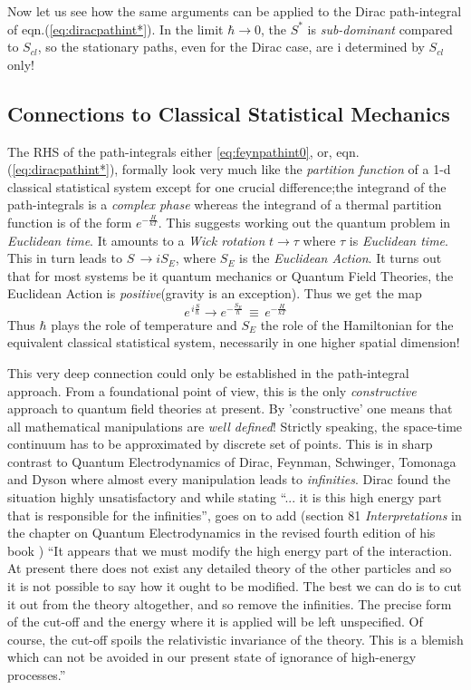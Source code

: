 \documentclass[12pt]{article}
\newcommand{\be}{\begin{equation}}
\newcommand{\ee}{\end{equation}}
\begin{document}
Now let us see how the same arguments can be applied to the Dirac path-integral of eqn.(\ref{eq:diracpathint*}). In the limit 
$\hbar \rightarrow  0$, the $S^*$ is \emph{sub-dominant} compared to $S_{cl}$, so the stationary paths, even for the Dirac case, are i
determined by $S_{cl}$ only!
\subsection{Connections to Classical Statistical Mechanics}
The RHS of the path-integrals either \ref{eq:feynpathint0}, or, eqn.(\ref{eq:diracpathint*}), formally look very much like 
the {\it partition function} of a 1-d classical
statistical system except for one crucial difference;the integrand of the path-integrals is a {\it complex phase} whereas the integrand of
a thermal partition function is of the form $e^{- \frac{H}{kT}}$. This suggests working out the quantum problem in {\it Euclidean time}. It
amounts to a {\it Wick rotation} $t \rightarrow  \tau$ where $\tau$ is {\it Euclidean time}. This in turn leads to $S\,\rightarrow i S_E$,
where $S_E$ is the {\it Euclidean Action}.
It turns out that for most systems be it 
quantum mechanics or Quantum Field Theories, the  Euclidean Action is {\it positive}(gravity is an exception). Thus we get the map
\be
\label{eq:euclidean}
e^{\,i \frac{S}{\hbar}} \rightarrow e^{- \frac{S_E}{\hbar}}\,\equiv\,e^{- \frac{H}{kT}}
\ee
Thus $\hbar$ plays the role of temperature and $S_E$ the role of the Hamiltonian for the equivalent classical statistical system, necessarily
in one higher spatial dimension!

This very deep connection could only be established in the path-integral approach. From a foundational point of view, this is the only
{\it constructive} approach to quantum field theories at present. By 'constructive' one means that all mathematical manipulations are
{\it well defined}! Strictly speaking, the space-time continuum has to be approximated by discrete set of points. This is in sharp contrast 
to Quantum Electrodynamics of Dirac, Feynman, Schwinger, Tomonaga and Dyson where almost 
every manipulation leads to {\it infinities}. Dirac found the situation highly unsatisfactory and while stating ``... it is this high 
energy part that is
responsible for the infinities'', goes on to add (section 81 {\it Interpretations} in the chapter on Quantum Electrodynamics in the revised
fourth edition of his book \cite{diracbook4r}) ``It appears that we must modify the high energy part of the interaction. At present there 
does not 
exist any detailed theory of the other particles and so it is not possible to say how it ought to be modified. The best we can do is to cut it
out from the theory altogether, and so remove the infinities. The precise form of the cut-off and the energy where it is applied 
will be left unspecified. Of course, the cut-off spoils the relativistic invariance of the theory. This is a blemish which can not be avoided
in our present state of ignorance of high-energy processes.''
\end{document}
